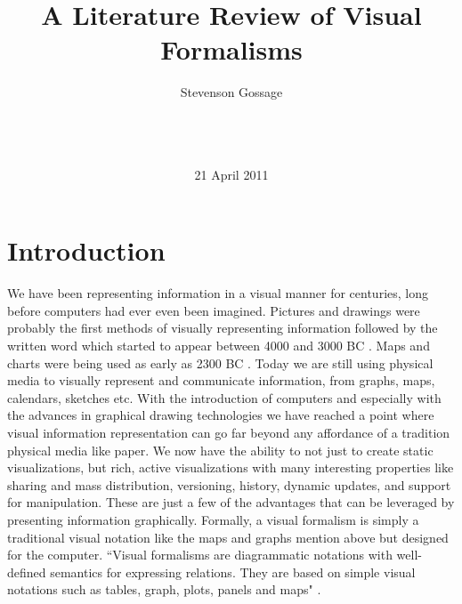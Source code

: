 \documentclass{sig-alternate}
\begin{document}
\title{A Literature Review of Visual Formalisms}
\author{ \alignauthor
Stevenson Gossage\\
\\
\\
\\
}
\date{21 April 2011}


\maketitle




\section{Introduction}
We have been representing information in a visual manner for centuries, long
before computers had ever even been imagined. Pictures and drawings were
probably the first methods of visually representing information followed by the
written word which started to appear between 4000 and 3000 BC
\cite{HistoryOfWriting}. Maps and charts were being used as early as 2300 BC
\cite{HistoryMapsCartography}. Today we are still using physical media to
visually represent and communicate information, from graphs, maps, calendars,
sketches etc. With the introduction of computers and especially with the
advances in graphical drawing technologies we have reached a point where visual
information representation can go far beyond any affordance of a tradition
physical media like paper. We now have the ability to not just to create static
visualizations, but rich, active visualizations with many interesting properties
like sharing and mass distribution, versioning, history, dynamic updates, and
support for manipulation. These are just a few of the advantages that can be
leveraged by presenting information graphically. Formally, a visual formalism is
simply a traditional visual notation like the maps and graphs mention above but
designed for the computer. ``Visual formalisms are diagrammatic notations with
well-defined semantics for expressing relations. They are based on simple visual
notations such as tables, graph, plots, panels and maps" \cite{Nardi:BeyondModels}.
\end{document}
